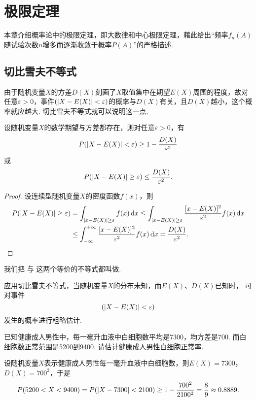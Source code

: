 \chapter{极限定理}
本章介绍概率论中的极限定理，即大数律和中心极限定理，藉此给出“频率\(f_n(A)\)随试验次数\(n\)增多而逐渐收敛于概率\(P(A)\)”的严格描述.

\section{切比雪夫不等式}
由于随机变量\(X\)的方差\(D(X)\)刻画了\(X\)取值集中在期望\(E(X)\)周围的程度，故对任意\(\varepsilon>0\)，事件\((\abs{X - E(X)} < \varepsilon)\)的概率与\(D(X)\)有关，且\(D(X)\)越小，这个概率就应越大.
切比雪夫不等式就可以说明这一点.
\begin{theorem}[切比雪夫不等式]\label{theorem:极限定理.切比雪夫不等式}
设随机变量\(X\)的数学期望与方差都存在，则对任意\(\varepsilon > 0\)，有\begin{equation}\label{equation:极限定理.切比雪夫不等式1}
P(\abs{X-E(X)}<\varepsilon) \geq 1 - \frac{D(X)}{\varepsilon^2}
\end{equation}或\begin{equation}\label{equation:极限定理.切比雪夫不等式2}
P(\abs{X-E(X)}\geq\varepsilon) \leq \frac{D(X)}{\varepsilon^2}.
\end{equation}
\begin{proof}
设连续型随机变量\(X\)的密度函数\(f(x)\)，则\begin{align*}
P(\abs{X-E(X)}\geq\varepsilon)
&=\int_{\abs{x-E(X)}\geq\varepsilon} f(x) \dd{x}
\leq \int_{\abs{x-E(X)}\geq\varepsilon} \frac{[x - E(X)]^2}{\varepsilon^2} f(x) \dd{x} \\
&\leq \int_{-\infty}^{+\infty} \frac{[x-E(X)]^2}{\varepsilon^2} f(x) \dd{x}
=\frac{D(X)}{\varepsilon^2}.
\qedhere
\end{align*}
\end{proof}
\end{theorem}

我们把 
与 
这两个等价的不等式都叫做.

应用切比雪夫不等式，当随机变量\(X\)的分布未知，而\(E(X)\)、\(D(X)\)已知时，
可对事件\[
(\abs{X-E(X)}<\varepsilon)
\]发生的概率进行粗略估计.

\begin{example}
已知健康成人男性中，每一毫升血液中白细胞数平均是7300，均方差是700.
而白细胞数正常范围是5200到9400.
请估计健康成人男性白细胞正常率.
\begin{solution}
设随机变量\(X\)表示健康成人男性每一毫升血液中白细胞数，则\(E(X) = 7300\)，\(D(X) = 700^2\)，于是\[
P(5200 < X < 9400)
= P(\abs{X - 7300} < 2100)
\geq 1 - \frac{700^2}{2100^2} = \frac{8}{9}
\approx 0.8889.
\]
\end{solution}
\end{example}

